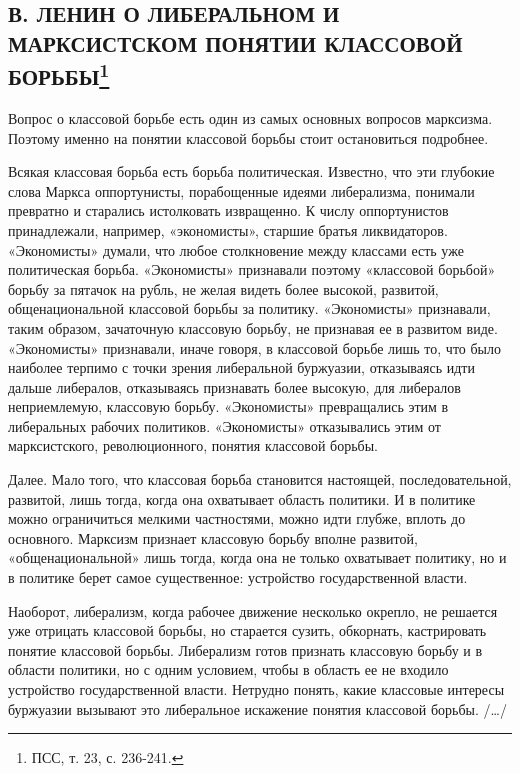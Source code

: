\documentclass[12pt]{article}
\newcommand{\parnum}{(\arabic{parcount})}
\newcounter{parcount}
\newenvironment{parnumbers}{%
  \par%
  \everypar{\noindent \stepcounter{parcount}\marginpar[]{\parnum}}%
}{}
\begin{document}
\subsection{В. ЛЕНИН О ЛИБЕРАЛЬНОМ И МАРКСИСТСКОМ ПОНЯТИИ КЛАССОВОЙ БОРЬБЫ\footnote{ПСС, т. 23, с. 236-241.}}

  \begin{parnumbers}
    Вопрос о классовой борьбе есть один из самых основных вопросов марксизма. Поэтому именно на понятии классовой борьбы стоит остановиться подробнее.

    Всякая классовая борьба есть борьба политическая. Известно, что эти глубокие слова Маркса оппортунисты, порабощенные идеями либерализма, понимали превратно и старались истолковать извращенно. К числу оппортунистов принадлежали, например, «экономисты», старшие братья ликвидаторов. «Экономисты» думали, что любое столкновение между классами есть уже политическая борьба. «Экономисты» признавали поэтому «классовой борьбой» борьбу за пятачок на рубль, не желая видеть более высокой, развитой, общенациональной классовой борьбы за политику. «Экономисты» признавали, таким образом, зачаточную классовую борьбу, не признавая ее в развитом виде. «Экономисты» признавали, иначе говоря, в классовой борьбе лишь то, что было наиболее терпимо с точки зрения либеральной буржуазии, отказываясь идти дальше либералов, отказываясь признавать более высокую, для либералов неприемлемую, классовую борьбу. «Экономисты» превращались этим в либеральных рабочих политиков. «Экономисты» отказывались этим от марксистского, революционного, понятия классовой борьбы.

    Далее. Мало того, что классовая борьба становится настоящей, последовательной, развитой, лишь тогда, когда она охватывает область политики. И в политике можно ограничиться мелкими частностями, можно идти глубже, вплоть до основного. Марксизм признает классовую борьбу вполне развитой, «общенациональной» лишь тогда, когда она не только охватывает политику, но и в политике берет самое существенное: устройство государственной власти.

    Наоборот, либерализм, когда рабочее движение несколько окрепло, не решается уже отрицать классовой борьбы, но старается сузить, обкорнать, кастрировать понятие классовой борьбы. Либерализм готов признать классовую борьбу и в области политики, но с одним условием, чтобы в область ее не входило устройство государственной власти. Нетрудно понять, какие классовые интересы буржуазии вызывают это либеральное искажение понятия классовой борьбы. /…/


\end{parnumbers}
\end{document}
